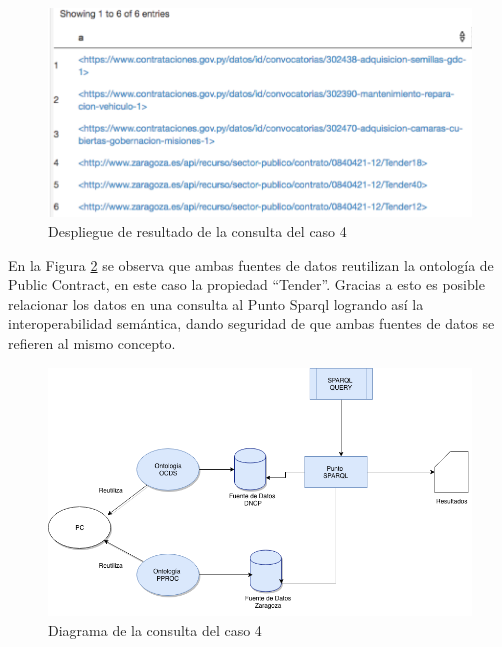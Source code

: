 \begin{figure}[ht!]
    \centering
    \includegraphics[width=150mm]{figuras/caso4Resultado.png}
    \caption{Despliegue de resultado de la consulta del caso 4}
    \label{img:caso4Resultado}
 \end{figure}


 En la Figura \ref{img:Diagramas-Caso 4} se observa que ambas fuentes de datos reutilizan la ontología de Public Contract, en este caso la propiedad “Tender”. Gracias a esto es posible relacionar los datos en una consulta al Punto Sparql logrando así la interoperabilidad semántica, dando seguridad de que ambas fuentes de datos se refieren al mismo concepto.

 \begin{figure}[ht!]
    \centering
    \includegraphics[width=150mm]{figuras/Diagramas-Caso4.png}
    \caption{Diagrama de la consulta del caso 4}
    \label{img:Diagramas-Caso 4}
 \end{figure}
